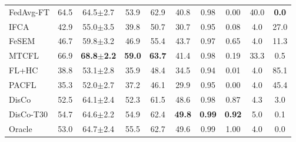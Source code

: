\begin{tabular}{lccccccccc}
FedAvg-FT & 64.5 & 64.5$\pm$2.7 & 53.9 & 62.9 & 40.8 & 0.98 & 0.00 & 40.0 & \textbf{0.0} \\
IFCA & 42.9 & 55.0$\pm$3.5 & 39.8 & 50.7 & 30.7 & 0.95 & 0.08 & 4.0 & 27.0 \\
FeSEM & 46.7 & 59.8$\pm$3.2 & 46.9 & 55.4 & 43.7 & 0.97 & 0.65 & 4.0 & 11.3 \\
MTCFL & 66.9 & \textbf{68.8$\pm$2.2} & \textbf{59.0} & \textbf{63.7} & 41.4 & 0.98 & 0.19 & 33.3 & 0.5 \\
FL+HC & 38.8 & 53.1$\pm$2.8 & 35.9 & 48.4 & 34.5 & 0.94 & 0.01 & 4.0 & 85.1 \\
PACFL & 35.3 & 52.0$\pm$2.7 & 37.2 & 46.1 & 29.9 & 0.95 & 0.00 & 4.0 & 45.4 \\
DisCo & 52.5 & 64.1$\pm$2.4 & 52.3 & 61.5 & 48.6 & 0.98 & 0.87 & 4.3 & 3.0 \\
DisCo-T30 & 54.7 & 64.6$\pm$2.2 & 54.9 & 62.4 & \textbf{49.8} & \textbf{0.99} & \textbf{0.92} & 5.0 & 0.1 \\
Oracle & 53.0 & 64.7$\pm$2.4 & 55.5 & 62.7 & 49.6 & 0.99 & 1.00 & 4.0 & 0.0 \\
\bottomrule
\end{tabular}
